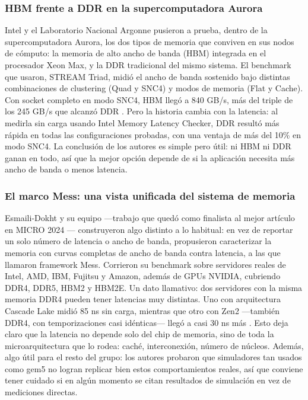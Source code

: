 
\subsubsection{HBM frente a DDR en la supercomputadora Aurora}

Intel y el Laboratorio Nacional Argonne pusieron a prueba, dentro de la supercomputadora Aurora,
los dos tipos de memoria que conviven en sus nodos de cómputo: la memoria de alto ancho de
banda (HBM) integrada en el procesador Xeon Max, y la DDR tradicional del mismo sistema. El
benchmark que usaron, STREAM Triad, midió el ancho de banda sostenido bajo distintas
combinaciones de clustering (Quad y SNC4) y modos de memoria (Flat y Cache). Con socket
completo en modo SNC4, HBM llegó a 840 GB/s, más del triple de los 245 GB/s que alcanzó
DDR \cite{ibeid2025aurora}. Pero la historia cambia con la latencia: al medirla sin carga usando Intel
Memory Latency Checker, DDR resultó más rápida en todas las configuraciones probadas, con
una ventaja de más del 10\% en modo SNC4. La conclusión de los autores es simple pero útil: ni
HBM ni DDR ganan en todo, así que la mejor opción depende de si la aplicación necesita más
ancho de banda o menos latencia.

\subsubsection{El marco Mess: una vista unificada del sistema de memoria}

Esmaili-Dokht y su equipo ---trabajo que quedó como finalista al mejor artículo en MICRO 2024
--- construyeron algo distinto a lo habitual: en vez de reportar un solo número de latencia o ancho
de banda, propusieron caracterizar la memoria con curvas completas de ancho de banda contra
latencia, a las que llamaron framework Mess. Corrieron su benchmark sobre servidores reales de
Intel, AMD, IBM, Fujitsu y Amazon, además de GPUs NVIDIA, cubriendo DDR4, DDR5, HBM2
y HBM2E. Un dato llamativo: dos servidores con la misma memoria DDR4 pueden tener latencias
muy distintas. Uno con arquitectura Cascade Lake midió 85 ns sin carga, mientras que otro con
Zen2 ---también DDR4, con temporizaciones casi idénticas--- llegó a casi 30 ns más
\cite{esmailidokht2024mess}. Esto deja claro que la latencia no depende solo del chip de memoria, sino de
toda la microarquitectura que lo rodea: caché, interconexión, número de núcleos. Además, algo
útil para el resto del grupo: los autores probaron que simuladores tan usados como gem5 no logran
replicar bien estos comportamientos reales, así que conviene tener cuidado si en algún momento
se citan resultados de simulación en vez de mediciones directas.

